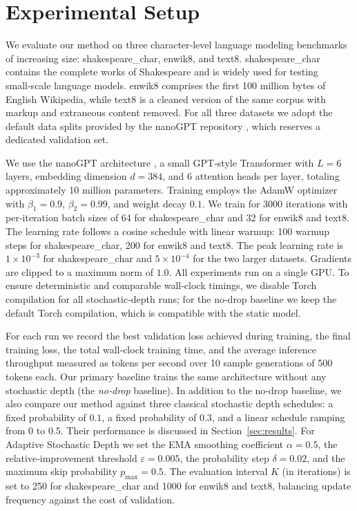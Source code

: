 \documentclass{article} %
\begin{document}
\section{Experimental Setup}
\label{sec:experimental}

We evaluate our method on three character‑level language modeling benchmarks of increasing size: shakespeare\_char, enwik8, and text8.
shakespeare\_char contains the complete works of Shakespeare and is widely used for testing small‑scale language models.
enwik8 comprises the first 100 million bytes of English Wikipedia, while text8 is a cleaned version of the same corpus with markup and extraneous content removed.
For all three datasets we adopt the default data splits provided by the nanoGPT repository \citep{karpathy2023nanogpt}, which reserves a dedicated validation set.

We use the nanoGPT architecture \citep{karpathy2023nanogpt}, a small GPT‑style Transformer with \(L=6\) layers, embedding dimension \(d=384\), and \(6\) attention heads per layer, totaling approximately 10 million parameters.
Training employs the AdamW optimizer \citep{loshchilov2017adamw} with \(\beta_1=0.9\), \(\beta_2=0.99\), and weight decay \(0.1\).
We train for 3000 iterations with per‑iteration batch sizes of 64 for shakespeare\_char and 32 for enwik8 and text8.
The learning rate follows a cosine schedule with linear warmup: 100 warmup steps for shakespeare\_char, 200 for enwik8 and text8.
The peak learning rate is \(1\times10^{-3}\) for shakespeare\_char and \(5\times10^{-4}\) for the two larger datasets.
Gradients are clipped to a maximum norm of \(1.0\).
All experiments run on a single GPU. To ensure deterministic and comparable wall‑clock timings, we disable Torch compilation for all stochastic‑depth runs; for the no‑drop baseline we keep the default Torch compilation, which is compatible with the static model.

For each run we record the best validation loss achieved during training, the final training loss, the total wall‑clock training time, and the average inference throughput measured as tokens per second over 10 sample generations of 500 tokens each.
Our primary baseline trains the same architecture without any stochastic depth (the \emph{no‑drop} baseline).
In addition to the no‑drop baseline, we also compare our method against three classical stochastic depth schedules: a fixed probability of \(0.1\), a fixed probability of \(0.3\), and a linear schedule ramping from \(0\) to \(0.5\). Their performance is discussed in Section~\ref{sec:results}.
For Adaptive Stochastic Depth we set the EMA smoothing coefficient \(\alpha=0.5\), the relative‑improvement threshold \(\varepsilon=0.005\), the probability step \(\delta=0.02\), and the maximum skip probability \(p_{\max}=0.5\).
The evaluation interval \(K\) (in iterations) is set to 250 for shakespeare\_char and 1000 for enwik8 and text8, balancing update frequency against the cost of validation.
\end{document}
